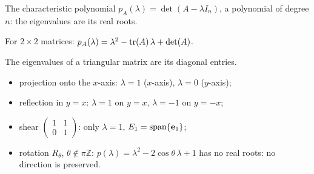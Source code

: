\documentclass[aspectratio=1610,11pt]{beamer}
\begin{document}
\begin{frame}{The characteristic polynomial}
    \small
    $p_A(\lambda) = \det(A - \lambda I_n)$, a polynomial of degree $n$: the eigenvalues are its real roots.
    \begin{proposition}
        \small For $2 \times 2$ matrices: $p_A(\lambda) = \lambda^2 - \operatorname{tr}(A)\,\lambda + \det(A)$.
    \end{proposition}
    \begin{proposition}
        \small The eigenvalues of a triangular matrix are its diagonal entries.
    \end{proposition}
    \begin{example}
        \small
        \begin{itemize}
            \item projection onto the $x$-axis: $\lambda = 1$ ($x$-axis), $\lambda = 0$ ($y$-axis);
            \item reflection in $y = x$: $\lambda = 1$ on $y = x$, $\lambda = -1$ on $y = -x$;
            \item shear $\begin{pmatrix} 1 & 1 \\ 0 & 1 \end{pmatrix}$: only $\lambda = 1$, $E_1 = \operatorname{span}\{\mathbf{e}_1\}$;
            \item rotation $R_\theta$, $\theta \notin \pi\mathbb{Z}$: $p(\lambda) = \lambda^2 - 2\cos\theta\,\lambda + 1$ has no real roots: no direction is preserved.
        \end{itemize}
    \end{example}
\end{frame}

\end{document}
